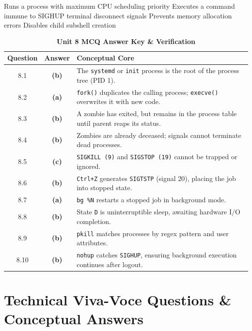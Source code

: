 {Runs a process with maximum CPU scheduling priority}
{Executes a command immune to SIGHUP terminal disconnect signals}
{Prevents memory allocation errors}
{Disables child subshell creation}

\begin{table}[htbp]
\centering
\caption{\textbf{Unit 8 MCQ Answer Key \& Verification}}
\begin{tabularx}{0.85\linewidth}{c c X}
\toprule
\textbf{Question} & \textbf{Answer} & \textbf{Conceptual Core} \\
\midrule
8.1 & \textbf{(b)} & The \texttt{systemd} or \texttt{init} process is the root of the process tree (PID 1). \\
8.2 & \textbf{(a)} & \texttt{fork()} duplicates the calling process; \texttt{execve()} overwrites it with new code. \\
8.3 & \textbf{(b)} & A zombie has exited, but remains in the process table until parent reaps its status. \\
8.4 & \textbf{(b)} & Zombies are already deceased; signals cannot terminate dead processes. \\
8.5 & \textbf{(c)} & \texttt{SIGKILL (9)} and \texttt{SIGSTOP (19)} cannot be trapped or ignored. \\
8.6 & \textbf{(b)} & \texttt{Ctrl+Z} generates \texttt{SIGTSTP} (signal 20), placing the job into stopped state. \\
8.7 & \textbf{(a)} & \texttt{bg \%N} restarts a stopped job in background mode. \\
8.8 & \textbf{(b)} & State \texttt{D} is uninterruptible sleep, awaiting hardware I/O completion. \\
8.9 & \textbf{(b)} & \texttt{pkill} matches processes by regex pattern and user attributes. \\
8.10 & \textbf{(b)} & \texttt{nohup} catches \texttt{SIGHUP}, ensuring background execution continues after logout. \\
\bottomrule
\end{tabularx}
\end{table}

\section{Technical Viva-Voce Questions \& Conceptual Answers}

